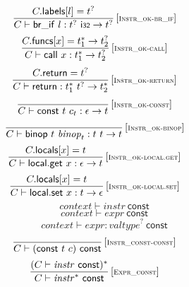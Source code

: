 \documentclass{article}
\begin{document}
$$
\begin{array}{@{}c@{}}\displaystyle
\frac{
C{.}\mathsf{labels}{}[l] = {t^?}
}{
C \vdash \mathsf{br\_if}~l : {t^?}~\mathsf{i{\scriptstyle 32}} \rightarrow {t^?}
} \, {[\textsc{\scriptsize Instr\_ok{-}br\_if}]}
\qquad
\end{array}
$$
$$
\begin{array}{@{}c@{}}\displaystyle
\frac{
C{.}\mathsf{funcs}{}[x] = {t_1^\ast} \rightarrow {t_2^?}
}{
C \vdash \mathsf{call}~x : {t_1^\ast} \rightarrow {t_2^?}
} \, {[\textsc{\scriptsize Instr\_ok{-}call}]}
\qquad
\end{array}
$$
$$
\begin{array}{@{}c@{}}\displaystyle
\frac{
C{.}\mathsf{return} = {t^?}
}{
C \vdash \mathsf{return} : {t_1^\ast}~{t^?} \rightarrow {t_2^\ast}
} \, {[\textsc{\scriptsize Instr\_ok{-}return}]}
\qquad
\end{array}
$$
$$
\begin{array}{@{}c@{}}\displaystyle
\frac{
}{
C \vdash \mathsf{const}~t~c_t : \epsilon \rightarrow t
} \, {[\textsc{\scriptsize Instr\_ok{-}const}]}
\qquad
\end{array}
$$
$$
\begin{array}{@{}c@{}}\displaystyle
\frac{
}{
C \vdash \mathsf{binop}~t~{\mathit{binop}}_t : t~t \rightarrow t
} \, {[\textsc{\scriptsize Instr\_ok{-}binop}]}
\qquad
\end{array}
$$
$$
\begin{array}{@{}c@{}}\displaystyle
\frac{
C{.}\mathsf{locals}{}[x] = t
}{
C \vdash \mathsf{local.get}~x : \epsilon \rightarrow t
} \, {[\textsc{\scriptsize Instr\_ok{-}local.get}]}
\qquad
\end{array}
$$
$$
\begin{array}{@{}c@{}}\displaystyle
\frac{
C{.}\mathsf{locals}{}[x] = t
}{
C \vdash \mathsf{local.set}~x : t \rightarrow \epsilon
} \, {[\textsc{\scriptsize Instr\_ok{-}local.set}]}
\qquad
\end{array}
$$
$$
\boxed{{\mathit{context}} \vdash {\mathit{instr}}~\mathsf{const}}
$$
$$
\boxed{{\mathit{context}} \vdash {\mathit{expr}}~\mathsf{const}}
$$
$$
\boxed{{\mathit{context}} \vdash {\mathit{expr}} : {{\mathit{valtype}}^?}~\mathsf{const}}
$$
$$
\begin{array}{@{}c@{}}\displaystyle
\frac{
}{
C \vdash (\mathsf{const}~t~c)~\mathsf{const}
} \, {[\textsc{\scriptsize Instr\_const{-}const}]}
\qquad
\end{array}
$$
$$
\begin{array}{@{}c@{}}\displaystyle
\frac{
(C \vdash {\mathit{instr}}~\mathsf{const})^\ast
}{
C \vdash {{\mathit{instr}}^\ast}~\mathsf{const}
} \, {[\textsc{\scriptsize Expr\_const}]}
\qquad
\end{array}
$$
\end{document}
